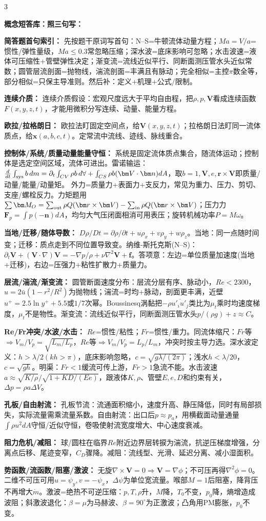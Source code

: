 \documentclass[a4paper]{article}
\newcommand{\sect}[1]{\par{\bfseries\color{Q}#1：}}
\begin{document}
\begin{multicols}{3}
{\sect{概念短答库：照三句写}
\sect{简答题首句索引}
先按题干原词写首句：N--S=牛顿流体动量方程；$Ma=V/a$=惯性/弹性量级，$Ma\le0.3$常忽略压缩；深水波=底床影响可忽略；水击波速=液体可压缩性+管壁弹性决定；渐变流=流线近似平行、同断面测压管水头近似常数；圆管层流剖面=抛物线，湍流剖面=丰满且有脉动；完全相似=主控$\pi$数全等，部分相似=只保主导准则。然后补：定义+机理+公式/限制。
\sect{连续介质}
连续介质假设：宏观尺度远大于平均自由程，把$\rho,p,\bm V$看成连续函数$F(x,y,z,t)$，才能用微积分写连续、动量、能量方程。
\sect{欧拉/拉格朗日}
欧拉法盯固定空间点，给$\bm V(x,y,z,t)$；拉格朗日法盯同一流体质点，给$\bm x(a,b,c,t)$。定常流中流线、迹线、脉线重合。
\sect{控制体/系统/质量动量能量守恒}
系统是固定流体质点集合，随流体运动；控制体是选定空间区域，流体可进出。雷诺输运：$\frac d{dt}\int_{\rm sys}b\,dm=\partial_t\int_{CV}\rho b\,d\forall+\int_{CS}\rho b(\bm V\cdot\bm n)dA$，取$b=1,\bm V,e,\bm r\times\bm V$即质量/动量/能量/动量矩。
外力=质量力+表面力+支反力，常见为重力、压力、剪切、支座/螺栓反力。力矩题用$\sum \bm M_O=\sum_{\rm out}\rho Q(\bm r\times\bm V)-\sum_{\rm in}\rho Q(\bm r\times\bm V)$；压力力$\bm F_p=\int p(-\bm n)dA$，均匀大气压闭面相消可用表压；旋转机械功率$P=M\omega$。
\sect{当地/迁移/随体导数}
$D\rho/Dt=\partial\rho/\partial t+u\rho_x+v\rho_y+w\rho_z$。当地：同一点随时间变；迁移：质点走到不同位置导致变。纳维-斯托克斯(N--S)：$\partial_t\bm V+(\bm V\cdot\nabla)\bm V=-\nabla p/\rho+\nu\nabla^2\bm V+\bm f$。答项意：左边=单位质量加速度(当地+迁移)，右边=压强力+粘性扩散力+质量力。
\sect{层流/湍流/渐变流}
圆管断面速度分布：层流分层有序、脉动小，$Re<2300$，$u=2\bar u(1-r^2/R^2)$为抛物线；湍流=时均+脉动，剖面更丰满，近壁$u^+=2.5\ln y^++5.5$或$1/7$次幂。Boussinesq涡黏把$-\rho\overline{u'_iu'_j}$类比为$\mu_t$乘时均速度梯度，$\mu_t$不是物性。渐变流：流线近似平行，同断面测压管水头$p/(\rho g)+z\approx C$。
\sect{Re/Fr冲突/水波/水击}
$Re$=惯性/粘性；$Fr$=惯性/重力。同流体缩尺：$Fr$等$\Rightarrow V_m/V_p=\sqrt{L_m/L_p}$，$Re$等$\Rightarrow V_m/V_p=L_p/L_m$，冲突时按主导力选。深水波定义：$h>\lambda/2(kh>\pi)$，底床影响忽略，$c=\sqrt{g\lambda/(2\pi)}$；浅水$h<\lambda/20$，$c=\sqrt{gh}$。明渠：$Fr<1$缓流可传上游，$Fr>1$急流不能。水击波速$a\approx\sqrt{K/\rho}/\sqrt{1+KD/(Ee)}$，跟液体$K,\rho$、管壁$E,e,D$和约束有关，$\Delta p=\rho a\Delta V$。
\sect{孔板/自由射流}
孔板节流：流通面积缩小，速度升高、静压降低，同时有局部损失，实际流量需乘流量系数。自由射流：出口后$p\approx p_a$，用横截面动量通量$\int\rho u^2dA$守恒/近似守恒，卷吸使射流宽度增大、中心速度衰减。
\sect{阻力危机/减阻}
球/圆柱在临界$Re$附近边界层转捩为湍流，抗逆压梯度增强，分离点后移、尾迹变窄，$C_D$骤降。减阻：流线型、光滑、延迟分离、减小湿面积。
\sect{势函数/流函数/阻塞/激波}
无旋$\nabla\times\bm V=0\Rightarrow\bm V=\nabla\phi$；不可压再得$\nabla^2\phi=0$。二维不可压可用$u=\psi_y,v=-\psi_x$，$\Delta\psi$为单位宽流量。喉部$M=1$后阻塞，降背压不再增大$\dot m$。激波=绝热不可逆压缩：$p,T,\rho$升，$M$降，$T_0$不变，$p_0$降，熵增造成波阻；斜激波退化：$\beta=\mu$为马赫波、$\beta=90^\circ$为正激波；凸角用PM膨胀，$p_0$不变。

}
\end{multicols}
\end{document}
